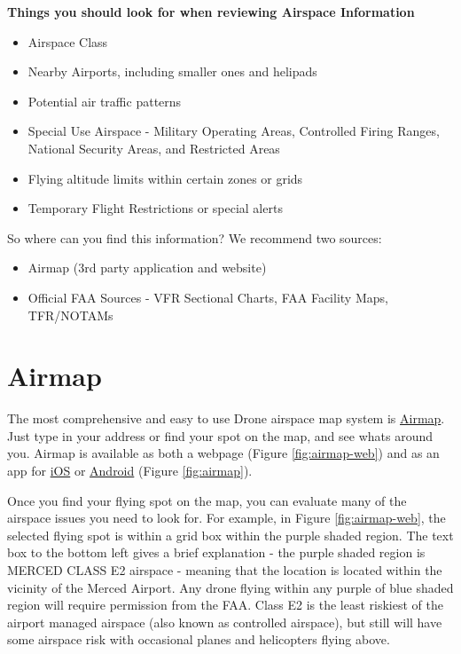 \documentclass[
]{book}
\providecommand{\tightlist}{%
  \setlength{\itemsep}{0pt}\setlength{\parskip}{0pt}}
\begin{document}
\textbf{Things you should look for when reviewing Airspace Information}

\begin{itemize}
\tightlist
\item
  Airspace Class
\item
  Nearby Airports, including smaller ones and helipads
\item
  Potential air traffic patterns
\item
  Special Use Airspace - Military Operating Areas, Controlled Firing Ranges, National Security Areas, and Restricted Areas
\item
  Flying altitude limits within certain zones or grids
\item
  Temporary Flight Restrictions or special alerts
\end{itemize}

So where can you find this information? We recommend two sources:

\begin{itemize}
\tightlist
\item
  Airmap (3rd party application and website)
\item
  Official FAA Sources - VFR Sectional Charts, FAA Facility Maps, TFR/NOTAMs
\end{itemize}

\hypertarget{airmap}{%
\section{Airmap}\label{airmap}}

The most comprehensive and easy to use Drone airspace map system is \href{https://app.airmap.com/}{Airmap}. Just type in your address or find your spot on the map, and see whats around you. Airmap is available as both a webpage (Figure \ref{fig:airmap-web}) and as an app for \href{https://apps.apple.com/us/app/airmap-for-drones/id1042824733}{iOS} or \href{https://play.google.com/store/apps/details?id=com.airmap.airmap\&hl=en_US}{Android} (Figure \ref{fig:airmap}).

Once you find your flying spot on the map, you can evaluate many of the airspace issues you need to look for. For example, in Figure \ref{fig:airmap-web}, the selected flying spot is within a grid box within the purple shaded region.
The text box to the bottom left gives a brief explanation - the purple shaded region is MERCED CLASS E2 airspace - meaning that the location is located within the vicinity of the Merced Airport. Any drone flying within any purple of blue shaded region will require permission from the FAA. Class E2 is the least riskiest of the airport managed airspace (also known as controlled airspace), but still will have some airspace risk with occasional planes and helicopters flying above.
\end{document}
